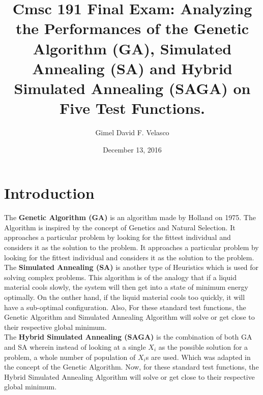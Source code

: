 \documentclass{article}
\begin{document}
\title{Cmsc 191 Final Exam: Analyzing the Performances of the Genetic Algorithm (GA), Simulated Annealing (SA) and Hybrid Simulated Annealing (SAGA) on Five Test Functions.}

\author{Gimel David F. Velasco}

\date{December 13, 2016}

\maketitle


\section{Introduction}
The \textbf{Genetic Algorithm (GA)} is an algorithm made by Holland on 1975. The Algorithm is inspired by the concept of Genetics and Natural Selection. It approaches a particular problem by looking for the fittest individual and considers it as the solution to the problem. It approaches a particular problem by looking for the fittest individual and considers it as the solution to the problem.\\

The \textbf{Simulated Annealing (SA)} is another type of Heuristics which is used for solving complex problems. This algorithm is of the analogy that if a liquid material cools slowly, the system will then get into a state of minimum energy optimally. On the onther hand, if the liquid material cools too quickly, it will have a sub-optimal configuration. Also, For these standard test functions, the Genetic Algorithm and Simulated Annealing Algorithm will solve or get close to their respective global minimum.\\

The \textbf{Hybrid Simulated Annealing (SAGA)} is the combination of both GA and SA wherein instead of looking at a single $X_i$ as the possible solution for a problem, a whole number of population of $X_i$s are used. Which was adapted in the concept of the Genetic Algorithm. Now, for these standard test functions, the Hybrid Simulated Annealing Algorithm will solve or get close to their respective global minimum.\\
\end{document}
